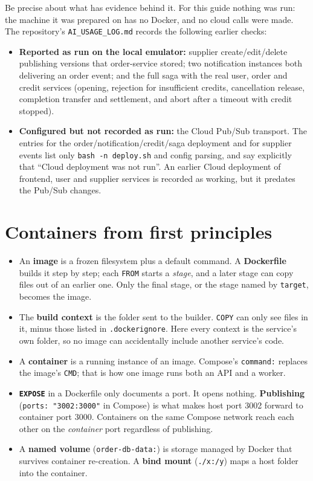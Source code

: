 \documentclass[11pt,a4paper]{article}
\newcommand{\code}[1]{\nolinkurl{#1}}
\begin{document}
Be precise about what has evidence behind it. For this guide nothing was run: the
machine it was prepared on has no Docker, and no cloud calls were made. The repository's
\code{AI_USAGE_LOG.md} records the following earlier checks:
\begin{itemize}
  \item \textbf{Reported as run on the local emulator:} supplier create/edit/delete
  publishing versions that order-service stored; two notification instances both
  delivering an order event; and the full saga with the real user, order and credit
  services (opening, rejection for insufficient credits, cancellation release,
  completion transfer and settlement, and abort after a timeout with credit stopped).
  \item \textbf{Configured but not recorded as run:} the Cloud Pub/Sub transport. The
  entries for the order/notification/credit/saga deployment and for supplier events
  list only \code{bash -n deploy.sh} and config parsing, and say explicitly that
  ``Cloud deployment was not run''. An earlier Cloud deployment of frontend, user and
  supplier services is recorded as working, but it predates the Pub/Sub changes.
\end{itemize}

\section{Containers from first principles}
\label{sec:containers}

\begin{itemize}
  \item An \textbf{image} is a frozen filesystem plus a default command. A
  \textbf{Dockerfile} builds it step by step; each \code{FROM} starts a \emph{stage}, and
  a later stage can copy files out of an earlier one. Only the final stage, or the stage
  named by \code{target}, becomes the image.
  \item The \textbf{build context} is the folder sent to the builder. \code{COPY} can only
  see files in it, minus those listed in \code{.dockerignore}. Here every context is the
  service's own folder, so no image can accidentally include another service's code.
  \item A \textbf{container} is a running instance of an image. Compose's
  \code{command:} replaces the image's \code{CMD}; that is how one image runs both an API
  and a worker.
  \item \textbf{\code{EXPOSE}} in a Dockerfile only documents a port. It opens nothing.
  \textbf{Publishing} (\code{ports: "3002:3000"} in Compose) is what makes host port
  3002 forward to container port 3000. Containers on the same Compose network reach each
  other on the \emph{container} port regardless of publishing.
  \item A \textbf{named volume} (\code{order-db-data:}) is storage managed by Docker that
  survives container re-creation. A \textbf{bind mount} (\code{./x:/y}) maps a host
  folder into the container.
\end{itemize}
\end{document}

